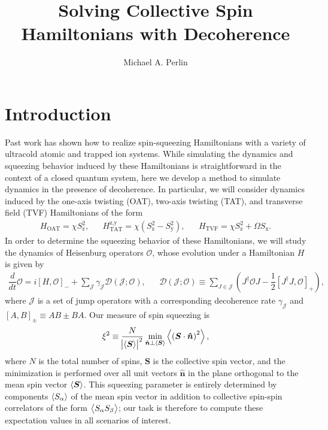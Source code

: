\documentclass[aps,notitlepage,nofootinbib,11pt]{revtex4-1}
\renewcommand{\t}{\text} %
\newcommand{\f}[2]{\dfrac{#1}{#2}} %
\newcommand{\p}[1]{\left(#1\right)} %
\renewcommand{\sp}[1]{\left[#1\right]} %
\renewcommand{\v}{\bm} %
\newcommand{\uv}[1]{\v{\hat{#1}}} %
\renewcommand{\c}{\cdot} %
\newcommand{\bk}{\Braket} %
\newcommand{\D}{\mathcal{D}}
\newcommand{\J}{\mathcal{J}}
\renewcommand{\O}{\mathcal{O}}
\newcommand{\z}{\text{z}}
\newcommand{\x}{\text{x}}
\newcommand{\y}{\text{y}}
\newcommand{\1}{\mathds{1}}
\begin{document}
\title{Solving Collective Spin Hamiltonians with Decoherence}

\author{Michael A. Perlin}

\maketitle

\tableofcontents

\newpage

\section{Introduction}

Past work has shown how to realize spin-squeezing Hamiltonians with a
variety of ultracold atomic and trapped ion systems.  While simulating
the dynamics and squeezing behavior induced by these Hamiltonians is
straightforward in the context of a closed quantum system, here we
develop a method to simulate dynamics in the presence of decoherence.
In particular, we will consider dynamics induced by the one-axis
twisting (OAT), two-axis twisting (TAT), and transverse field (TVF)
Hamiltonians of the form
\begin{align}
  H_{\t{OAT}} = \chi S_\z^2,
  &&
  H_{\t{TAT}}^{\z,\y} = \chi \p{S_\z^2 - S_\y^2},
  &&
  H_{\t{TVF}} = \chi S_\z^2 + \Omega S_\x.
\end{align}
In order to determine the squeezing behavior of these Hamiltonians, we
will study the dynamics of Heisenburg operators $\O$, whose evolution
under a Hamiltonian $H$ is given by
\begin{align}
  \f{d}{dt} \O = i\sp{H,\O}_- + \sum_\J \gamma_\J \D\p{\J;\O},
  &&
  \D\p{\J;\O}
  \equiv \sum_{J\in\J}\p{J^\dag \O J - \f12\sp{J^\dag J,\O}_+},
  \label{eq:EOM}
\end{align}
where $\J$ is a set of jump operators with a corresponding decoherence
rate $\gamma_\J$ and $\sp{A,B}_\pm\equiv AB\pm BA$.  Our measure of
spin squeezing is
\begin{align}
  \xi^2 \equiv \f{N}{\abs{\bk{\v S}}^2}
  \min_{\uv n\perp\bk{\v S}} \bk{\p{\v S\c\uv n}^2},
  \label{eq:squeezing}
\end{align}
where $N$ is the total number of spins, $\v S$ is the collective spin
vector, and the minimization is performed over all unit vectors
$\uv n$ in the plane orthogonal to the mean spin vector $\bk{\v S}$.
This squeezing parameter is entirely determined by components
$\bk{S_\alpha}$ of the mean spin vector in addition to collective
spin-spin correlators of the form $\bk{S_\alpha S_\beta}$; our task is
therefore to compute these expectation values in all scenarios of
interest.
\end{document}
